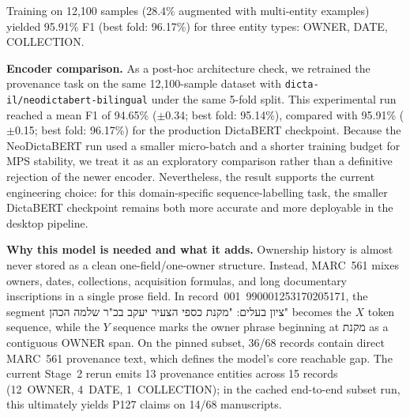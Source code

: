 \documentclass[Afour,sageh,times]{sagej}
\newcommand{\texthebrew}[1]{{\hebrewfont #1}}
\begin{document}
Training on 12,100 samples (28.4\% augmented with multi-entity examples) yielded 95.91\% F1 (best fold: 96.17\%) for three entity types: OWNER, DATE, COLLECTION.

\textbf{Encoder comparison.} As a post-hoc architecture check, we retrained the provenance task on the same 12,100-sample dataset with \texttt{dicta-il/neodictabert-bilingual} under the same 5-fold split. This experimental run reached a mean F1 of 94.65\% ($\pm$0.34; best fold: 95.14\%), compared with 95.91\% ($\pm$0.15; best fold: 96.17\%) for the production DictaBERT checkpoint. Because the NeoDictaBERT run used a smaller micro-batch and a shorter training budget for MPS stability, we treat it as an exploratory comparison rather than a definitive rejection of the newer encoder. Nevertheless, the result supports the current engineering choice: for this domain-specific sequence-labelling task, the smaller DictaBERT checkpoint remains both more accurate and more deployable in the desktop pipeline.

\textbf{Why this model is needed and what it adds.} Ownership history is almost never stored as a clean one-field/one-owner structure. Instead, MARC~561 mixes owners, dates, collections, acquisition formulas, and long documentary inscriptions in a single prose field. In record~001~990001253170205171, the segment \texthebrew{ציון בעלים: "מקנת כספי הצעיר יעקב בכ"ר שלמה הכהן"} becomes the $X$ token sequence, while the $Y$ sequence marks the owner phrase beginning at \texthebrew{מקנת} as a contiguous OWNER span. On the pinned subset, 36/68 records contain direct MARC~561 provenance text, which defines the model's core reachable gap. The current Stage~2 rerun emits 13 provenance entities across 15 records (12~OWNER, 4~DATE, 1~COLLECTION); in the cached end-to-end subset run, this ultimately yields P127 claims on 14/68 manuscripts.
\end{document}
